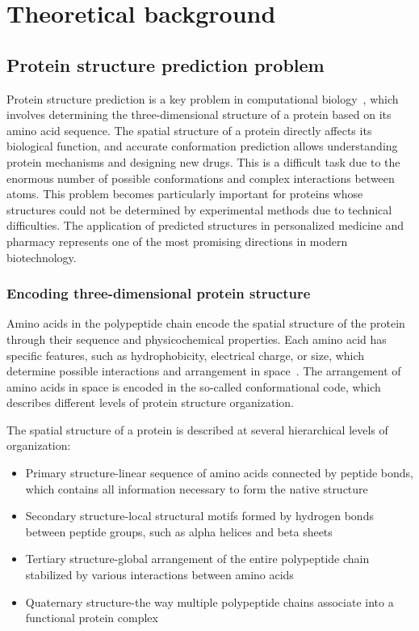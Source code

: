 \usepackage{listings}
\usepackage{svg}
\chapter{Theoretical background}


\section{Protein structure prediction problem}
Protein structure prediction is a key problem in computational biology~\cite{alphafold3}, which involves determining the three-dimensional structure of a protein based on its amino acid sequence.
The spatial structure of a protein directly affects its biological function, and accurate conformation prediction allows understanding protein mechanisms and designing new drugs.
This is a difficult task due to the enormous number of possible conformations and complex interactions between atoms.
This problem becomes particularly important for proteins whose structures could not be determined by experimental methods due to technical difficulties.
The application of predicted structures in personalized medicine and pharmacy represents one of the most promising directions in modern biotechnology.

\subsection{Encoding three-dimensional protein structure}
Amino acids in the polypeptide chain encode the spatial structure of the protein through their sequence and physicochemical properties.
Each amino acid has specific features, such as hydrophobicity, electrical charge, or size, which determine possible interactions and arrangement in space~\cite{protein_folding}.
The arrangement of amino acids in space is encoded in the so-called conformational code, which describes different levels of protein structure organization.

The spatial structure of a protein is described at several hierarchical levels of organization:

\begin{itemize}
    \item Primary structure-linear sequence of amino acids connected by peptide bonds, which contains all information necessary to form the native structure
    \item Secondary structure-local structural motifs formed by hydrogen bonds between peptide groups, such as alpha helices and beta sheets
    \item Tertiary structure-global arrangement of the entire polypeptide chain stabilized by various interactions between amino acids
    \item Quaternary structure-the way multiple polypeptide chains associate into a functional protein complex
\end{itemize}

